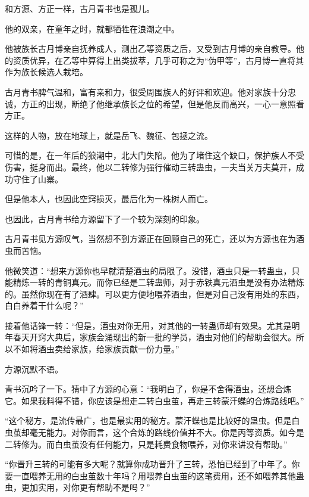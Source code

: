 
\begin{this_body}



和方源、方正一样，古月青书也是孤儿。

他的双亲，在童年之时，就都牺牲在浪潮之中。

他被族长古月博亲自抚养成人，测出乙等资质之后，又受到古月博的亲自教导。他的资质优异，在乙等中算得上出类拔萃，几乎可称之为“伪甲等”，古月博一直将其作为族长候选人栽培。

古月青书脾气温和，富有亲和力，很受周围族人的好评和欢迎。他对家族十分忠诚，方正的出现，断绝了他继承族长之位的希望，但是他反而高兴，一心一意照看方正。

这样的人物，放在地球上，就是岳飞、魏征、包拯之流。

可惜的是，在一年后的狼潮中，北大门失陷。他为了堵住这个缺口，保护族人不受伤害，挺身而出。最终，他以二转修为强行催动三转蛊虫，一夫当关万夫莫开，成功守住了山寨。

但是他本人，也因此空窍损灭，最后化为一株树人而亡。

也因此，古月青书给方源留下了一个较为深刻的印象。

古月青书见方源叹气，当然想不到方源正在回顾自己的死亡，还以为方源也在为酒虫而苦恼。

他微笑道：“想来方源你也早就清楚酒虫的局限了。没错，酒虫只是一转蛊虫，只能精炼一转的青铜真元。而你已经是二转蛊师，对于赤铁真元酒虫是没有办法精炼的。虽然你现在有了酒肆。可以更方便地喂养酒虫，但是对自己没有用处的东西，白白养着干什么呢？”

接着他话锋一转：“但是，酒虫对你无用，对其他的一转蛊师却有效果。尤其是明年春天开窍大典后，家族会涌现出的新一批的学员，酒虫对他们的帮助会很大。所以不如将酒虫卖给家族，给家族贡献一份力量。”

方源沉默不语。

青书沉吟了一下。猜中了方源的心意：“我明白了，你是不舍得酒虫，还想合炼它。如果我料得不错，你应该是想走二转白虫茧，再走三转蒙汗蝶的合炼路线吧。”

“这个秘方，是流传最广，也是最实用的秘方。蒙汗蝶也是比较好的蛊虫。但是白虫茧却毫无能力。对你而言，这个合炼的路线价值并不大。你是丙等资质。如今是二转修为。而白虫茧没有任何能力，只是耗费食物喂养，对你来讲没有帮助。”

“你晋升三转的可能有多大呢？就算你成功晋升了三转，恐怕已经到了中年了。你要一直喂养无用的白虫茧数十年吗？用喂养白虫茧的这笔费用，还不如喂养其他蛊虫，更加实用，对你更有帮助不是吗？”


\end{this_body}
